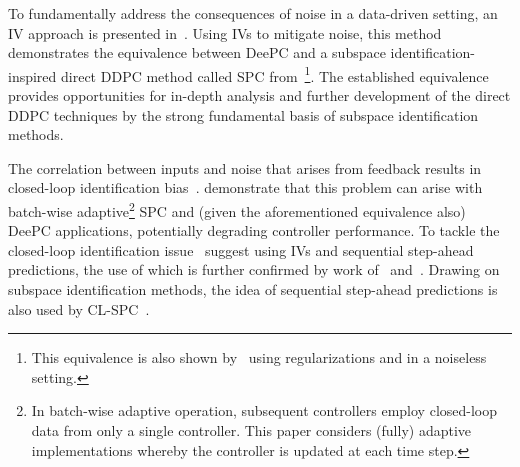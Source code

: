 To fundamentally address the consequences of noise in a data-driven setting, an \ac{IV} approach is presented in~\cite{vanWingerden2022}. %
Using \ac{IVs} to mitigate noise, this method %
demonstrates the equivalence between \ac{DeePC} and a subspace identification-inspired direct \ac{DDPC} method called \ac{SPC} from~\cite{Favoreel1999}\footnote{This equivalence is also shown by~\cite{Fiedler2021} using regularizations and in a noiseless setting.}. The established equivalence provides opportunities for in-depth analysis and further development of the direct \ac{DDPC} techniques by the strong fundamental basis of subspace identification methods. %

The correlation between inputs and noise that arises from feedback results in closed-loop identification bias~\citep{Soderstrom1989a}. %
\cite{Dinkla2023} demonstrate that this problem can arise with batch-wise adaptive\footnote{In batch-wise adaptive operation, subsequent controllers employ closed-loop data from only a single controller. This paper considers (fully) adaptive implementations whereby the controller is updated at each time step.} \ac{SPC} and (given the aforementioned equivalence also) \ac{DeePC} applications, potentially degrading controller performance. To tackle the closed-loop identification issue~\cite{Dinkla2023} suggest using \ac{IVs} and sequential step-ahead predictions, the use of which is further confirmed by work of~\cite{Wang2023} and~\cite{Shi2023}. Drawing on subspace identification methods, the idea of sequential step-ahead predictions is also used by \acf{CL-SPC}~\citep{Dong2008}. %

